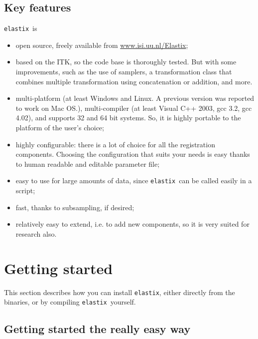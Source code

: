 \documentclass[]{report}
\newcommand{\elastix}{\texttt{elastix}}
\begin{document}
\subsection{Key features}\label{sec:elastix:key}

\elastix\ is
\begin{itemize}
\item open source, freely available from \url{www.isi.uu.nl/Elastix};

\item based on the ITK, so the code base is thoroughly tested.
But with some improvements, such as the use of samplers, a
transformation class that combines multiple transformation using
concatenation or addition, and more.

\item multi-platform (at least Windows and Linux. A previous version
was reported to work on Mac OS.), multi-compiler (at least Visual C++
2003, gcc 3.2, gcc 4.02), and supports 32 and 64 bit systems. So, it
is highly portable to the platform of the user's choice;

\item highly configurable: there is a lot of choice for all the registration
components. Choosing the configuration that suits your needs is easy
thanks to human readable and editable parameter file;

\item easy to use for large amounts of data, since \elastix\ can be
called easily in a script;

\item fast, thanks to subsampling, if desired;

\item relatively easy to extend, i.e. to add new components, so it is
very suited for research also.
\end{itemize}

\section{Getting started}\label{sec:elastix:install}

This section describes how you can install \elastix, either directly
from the binaries, or by compiling \elastix\ yourself.

\subsection{Getting started the really easy way}
\end{document}
